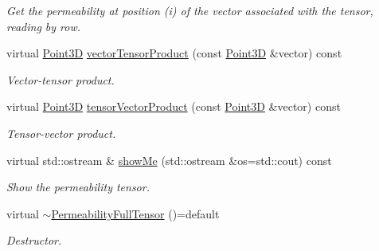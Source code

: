 \begin{DoxyCompactItemize}
\begin{DoxyCompactList}\small\item\em Get the permeability at position (i) of the vector associated with the tensor, reading by row. \end{DoxyCompactList}\item 
virtual \hyperlink{classFVCode3D_1_1Point3D}{Point3D} \hyperlink{classFVCode3D_1_1PermeabilityFullTensor_ac33ae20597f68533e0c7291fb8c49058}{vector\+Tensor\+Product} (const \hyperlink{classFVCode3D_1_1Point3D}{Point3D} \&vector) const 
\begin{DoxyCompactList}\small\item\em Vector-\/tensor product. \end{DoxyCompactList}\item 
virtual \hyperlink{classFVCode3D_1_1Point3D}{Point3D} \hyperlink{classFVCode3D_1_1PermeabilityFullTensor_aeb8c9cc6c4f91e826ecec60333aaba6b}{tensor\+Vector\+Product} (const \hyperlink{classFVCode3D_1_1Point3D}{Point3D} \&vector) const 
\begin{DoxyCompactList}\small\item\em Tensor-\/vector product. \end{DoxyCompactList}\item 
virtual std\+::ostream \& \hyperlink{classFVCode3D_1_1PermeabilityFullTensor_aa6e8ce4765e44c4acca4ebd5974436dd}{show\+Me} (std\+::ostream \&os=std\+::cout) const 
\begin{DoxyCompactList}\small\item\em Show the permeability tensor. \end{DoxyCompactList}\item 
virtual \hyperlink{classFVCode3D_1_1PermeabilityFullTensor_a38c20e6746dd7db2f726e0fc05a79bee}{$\sim$\+Permeability\+Full\+Tensor} ()=default
\begin{DoxyCompactList}\small\item\em Destructor. \end{DoxyCompactList}\end{DoxyCompactItemize}
